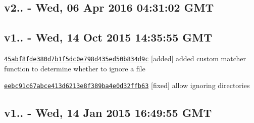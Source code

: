 
\begin{DoxyItemize}
\item 
\end{DoxyItemize}

\subsection*{v2.. -\/ Wed, 06 Apr 2016 04\+:31\+:02 G\+MT }


\begin{DoxyItemize}
\item 
\end{DoxyItemize}

\subsection*{v1.. -\/ Wed, 14 Oct 2015 14\+:35\+:55 G\+MT }


\begin{DoxyItemize}
\item \href{../../commit/45abf8fde380d7b1f5dc0e798d435ed50b834d9c}{\tt 45abf8fde380d7b1f5dc0e798d435ed50b834d9c} \mbox{[}added\mbox{]} added custom matcher function to determine whether to ignore a file
\item \href{../../commit/eebc91c67abce413d6213e8f389ba4e0d32ffb63}{\tt eebc91c67abce413d6213e8f389ba4e0d32ffb63} \mbox{[}fixed\mbox{]} allow ignoring directories
\end{DoxyItemize}

\subsection*{v1.. -\/ Wed, 14 Jan 2015 16\+:49\+:55 G\+MT }


\begin{DoxyItemize}
\item 
\end{DoxyItemize}